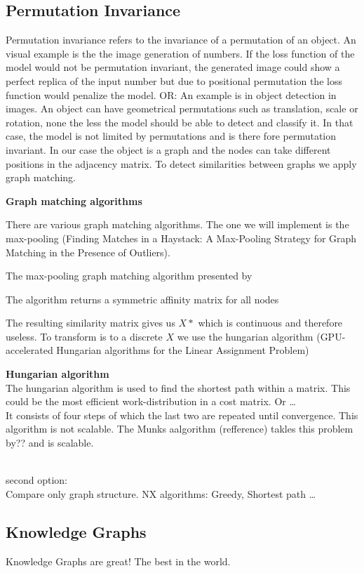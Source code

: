 \subsection{Permutation Invariance}


Permutation invariance refers to the invariance of a permutation of an object. An visual example is the the image generation of numbers. If the loss function of the model would not be permutation invariant, the generated image could show a perfect replica of the input number but due to positional permutation the loss function would penalize the model. 
OR: An example is in object detection in images. An object can have geometrical permutations such as translation, scale or rotation, none the less the model should be able to detect and classify it. In that case, the model is not limited by permutations and  is there fore permutation invariant.
In our case the object is a graph and the nodes can take different positions in the adjacency matrix. To detect similarities between graphs we apply graph matching.

\textbf{Graph matching algorithms}

There are various graph matching algorithms. The one we will implement is the max-pooling (Finding Matches in a Haystack: A Max-Pooling Strategy for Graph Matching in the Presence of Outliers). 

The max-pooling graph matching algorithm presented by

The algorithm returns a symmetric affinity matrix for all nodes

The resulting similarity matrix gives us $X*$ which is continuous and therefore useless. To transform is to a discrete $X$ we use the hungarian algorithm (GPU-accelerated Hungarian algorithms for the Linear
Assignment Problem)

\textbf{Hungarian algorithm}\\
The hungarian algorithm is used to find the shortest path within a matrix. This could be the most efficient work-distribution in a cost matrix. Or \dots \\
It consists of four steps of which the last two are repeated until convergence. This algorithm is not scalable. The Munks aalgorithm (refference) takles this problem by?? and is scalable.

\\
second option:\\
Compare only graph structure. 
NX algorithms: Greedy, Shortest path \dots



\subsection{Knowledge Graphs}

Knowledge Graphs are great! The best in the world.

